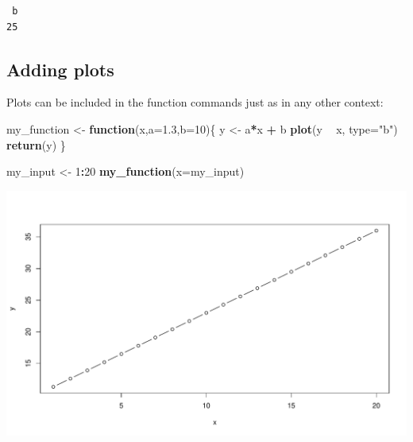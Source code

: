 \documentclass[
]{book}
\newenvironment{Shaded}{\begin{snugshade}}{\end{snugshade}}
\newcommand{\ControlFlowTok}[1]{\textcolor[rgb]{0.13,0.29,0.53}{\textbf{#1}}}
\newcommand{\DataTypeTok}[1]{\textcolor[rgb]{0.13,0.29,0.53}{#1}}
\newcommand{\DecValTok}[1]{\textcolor[rgb]{0.00,0.00,0.81}{#1}}
\newcommand{\FloatTok}[1]{\textcolor[rgb]{0.00,0.00,0.81}{#1}}
\newcommand{\KeywordTok}[1]{\textcolor[rgb]{0.13,0.29,0.53}{\textbf{#1}}}
\newcommand{\NormalTok}[1]{#1}
\newcommand{\OperatorTok}[1]{\textcolor[rgb]{0.81,0.36,0.00}{\textbf{#1}}}
\newcommand{\StringTok}[1]{\textcolor[rgb]{0.31,0.60,0.02}{#1}}
\begin{document}
\begin{verbatim}
 b 
25 
\end{verbatim}

\hypertarget{adding-plots}{%
\subsection*{Adding plots}\label{adding-plots}}

Plots can be included in the function commands just as in any other context:

\begin{Shaded}
\begin{Highlighting}[]
\NormalTok{my_function <-}\StringTok{ }\ControlFlowTok{function}\NormalTok{(x,}\DataTypeTok{a=}\FloatTok{1.3}\NormalTok{,}\DataTypeTok{b=}\DecValTok{10}\NormalTok{)\{}
\NormalTok{  y <-}\StringTok{ }\NormalTok{a}\OperatorTok{*}\NormalTok{x }\OperatorTok{+}\StringTok{ }\NormalTok{b}
  \KeywordTok{plot}\NormalTok{(y }\OperatorTok{~}\StringTok{ }\NormalTok{x, }\DataTypeTok{type=}\StringTok{"b"}\NormalTok{)}
  \KeywordTok{return}\NormalTok{(y)}
\NormalTok{\}}
\end{Highlighting}
\end{Shaded}

\begin{Shaded}
\begin{Highlighting}[]
\NormalTok{my_input <-}\StringTok{ }\DecValTok{1}\OperatorTok{:}\DecValTok{20}
\KeywordTok{my_function}\NormalTok{(}\DataTypeTok{x=}\NormalTok{my_input)}
\end{Highlighting}
\end{Shaded}

\includegraphics{figures/unnamed-chunk-238-1.pdf}
\end{document}
